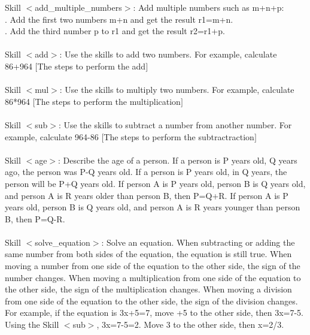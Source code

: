 \documentclass{article} %
\begin{document}
\begin{tcolorbox}[title = {Skills for GSM8K}, colback = Apricot!25!white, colframe = BrickRed!75!black,fontupper =\fontsize{9pt}{9pt}\selectfont]
Skill $<$add\_multiple\_numbers$>$: Add multiple numbers such as m+n+p:  \\
. Add the first two numbers m+n and get the result r1=m+n. \\ 
. Add the third number p to r1 and get the result r2=r1+p.  \\ \\


Skill $<$add$>$: Use the skills to add two numbers. For example, calculate 86+964 $[$The steps to perform the add$]$ \\ \\


Skill $<$mul$>$: Use the skills to multiply two numbers. For example, calculate 86*964 $[$The steps to perform the multiplication$]$ \\ \\

Skill $<$sub$>$:  Use the skills to subtract a number from another number. For example, calculate 964-86 $[$The steps to perform the subtractraction$]$ \\ \\

Skill $<$age$>$: Describe the age of a person.  If a person is P years old, Q years ago, the person was P-Q years old.  If a person is P years old, in Q years, the person will be P+Q years old. If person A is P years old, person B is Q years old, and person A is R years older than person B, then P=Q+R. If person A is P years old, person B is Q years old, and person A is R years younger than person B, then P=Q-R. \\ \\


Skill $<$solve\_equation$>$: Solve an equation. When subtracting or adding the same number from both sides of the equation, the equation is still true. When moving a number from one side of the equation to the other side, the sign of the number changes. When moving a multiplication from one side of the equation to the other side, the sign of the multiplication changes. When moving a division from one side of the equation to the other side, the sign of the division changes. \\
For example, if the equation is 3x+5=7, move +5 to the other side, then 3x=7-5. Using the Skill $<$sub$>$, 3x=7-5=2. Move 3 to the other side, then x=2/3. \\ 
\end{tcolorbox}
\noindent\begin{minipage}{\textwidth} 
 \label{Tab:gsm8k_skill}
\end{minipage}
\end{document}

